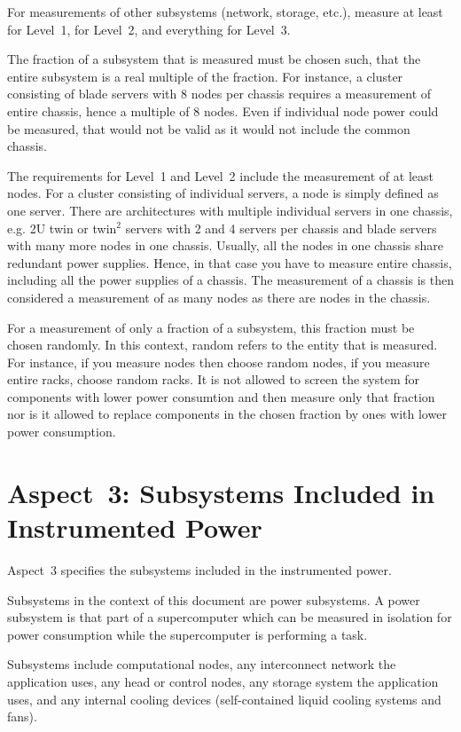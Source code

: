 \noindent
For measurements of other subsystems (network, storage, etc.), measure at least \SpecFracMinLOne{} for Level~1, \SpecFracMinLTwo{} for Level~2, and everything for Level~3.
\wl

\noindent
The fraction of a subsystem that is measured must be chosen such, that the entire subsystem is a real multiple of the fraction.
For instance, a cluster consisting of blade servers with 8 nodes per chassis requires a measurement of entire chassis, hence a multiple of 8 nodes.
Even if individual node power could be measured, that would not be valid as it would not include the common chassis.
\wl

\noindent
The requirements for Level~1 and Level~2 include the measurement of at least \SpecMinNodes{} nodes.
For a cluster consisting of individual servers, a node is simply defined as one server.
There are architectures with multiple individual servers in one chassis, e.g.
2U twin or twin$^2$ servers with 2 and 4 servers per chassis and blade servers with many more nodes in one chassis.
Usually, all the nodes in one chassis share redundant power supplies.
Hence, in that case you have to measure entire chassis, including all the power supplies of a chassis.
The measurement of a chassis is then considered a measurement of as many nodes as there are nodes in the chassis.
\wl

\noindent
For a measurement of only a fraction of a subsystem, this fraction must be chosen randomly.
In this context, random refers to the entity that is measured.
For instance, if you measure nodes then choose random nodes, if you measure entire racks, choose random racks.
It is not allowed to screen the system for components with lower power consumtion and then measure only that fraction nor is it allowed to replace components in the chosen fraction by ones with lower power consumption.
\wl

\section{Aspect~3: Subsystems Included in Instrumented Power}
\label{sec:A3SIiIP}
\noindent
Aspect~3 specifies the subsystems included in the instrumented power.
\wl

\noindent
Subsystems in the context of this document are power subsystems.
A power subsystem is that part of a supercomputer which can be measured in isolation for power consumption while the supercomputer is performing a task.
\wl

\noindent
Subsystems include computational nodes, any interconnect network the application uses, any head or control nodes, any storage system the application uses, and any internal cooling devices (self-contained liquid cooling systems and fans).
\wl

